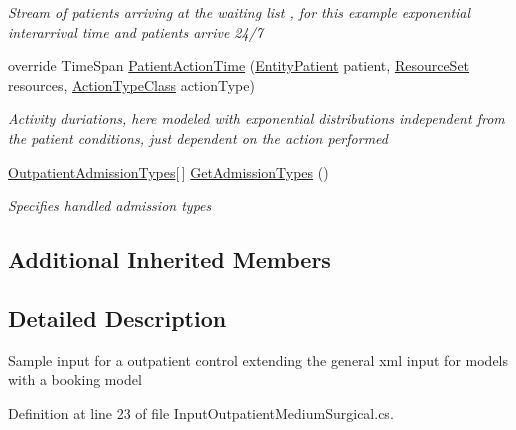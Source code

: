\begin{DoxyCompactItemize}
\begin{DoxyCompactList}\small\item\em Stream of patients arriving at the waiting list , for this example exponential interarrival time and patients arrive 24/7 \end{DoxyCompactList}\item 
override Time\+Span \hyperlink{class_sample_hospital_model_1_1_outpatient_1_1_input_outpatient_medium_surgical_afefb1828113868ba5495912a1a350b0d}{Patient\+Action\+Time} (\hyperlink{class_general_health_care_elements_1_1_entities_1_1_entity_patient}{Entity\+Patient} patient, \hyperlink{class_general_health_care_elements_1_1_resource_handling_1_1_resource_set}{Resource\+Set} resources, \hyperlink{class_general_health_care_elements_1_1_general_classes_1_1_action_types_and_paths_1_1_action_type_class}{Action\+Type\+Class} action\+Type)
\begin{DoxyCompactList}\small\item\em Activity duriations, here modeled with exponential distributions independent from the patient conditions, just dependent on the action performed \end{DoxyCompactList}\item 
\hyperlink{class_general_health_care_elements_1_1_treatment_admission_types_1_1_outpatient_admission_types}{Outpatient\+Admission\+Types}\mbox{[}$\,$\mbox{]} \hyperlink{class_sample_hospital_model_1_1_outpatient_1_1_input_outpatient_medium_surgical_aeda7118a5f0161fcd85ac1ff8874d7e6}{Get\+Admission\+Types} ()
\begin{DoxyCompactList}\small\item\em Specifies handled admission types \end{DoxyCompactList}\end{DoxyCompactItemize}
\subsection*{Additional Inherited Members}


\subsection{Detailed Description}
Sample input for a outpatient control extending the general xml input for models with a booking model 



Definition at line 23 of file Input\+Outpatient\+Medium\+Surgical.\+cs.



